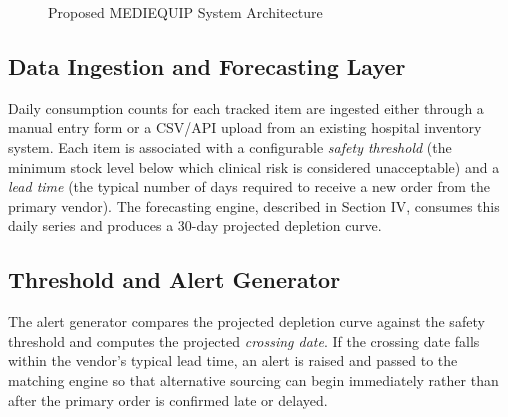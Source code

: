 \documentclass[conference]{IEEEtran}
\begin{document}
\begin{figure}[htbp]
{%
}
\caption{Proposed MEDIEQUIP System Architecture}
\label{fig:arch}
\end{figure}

\subsection{Data Ingestion and Forecasting Layer}

Daily consumption counts for each tracked item are ingested either through a manual entry form or a CSV/API upload from an existing hospital inventory system. Each item is associated with a configurable \emph{safety threshold} (the minimum stock level below which clinical risk is considered unacceptable) and a \emph{lead time} (the typical number of days required to receive a new order from the primary vendor). The forecasting engine, described in Section IV, consumes this daily series and produces a 30-day projected depletion curve.

\subsection{Threshold and Alert Generator}

The alert generator compares the projected depletion curve against the safety threshold and computes the projected \emph{crossing date}. If the crossing date falls within the vendor's typical lead time, an alert is raised and passed to the matching engine so that alternative sourcing can begin immediately rather than after the primary order is confirmed late or delayed.
\end{document}

